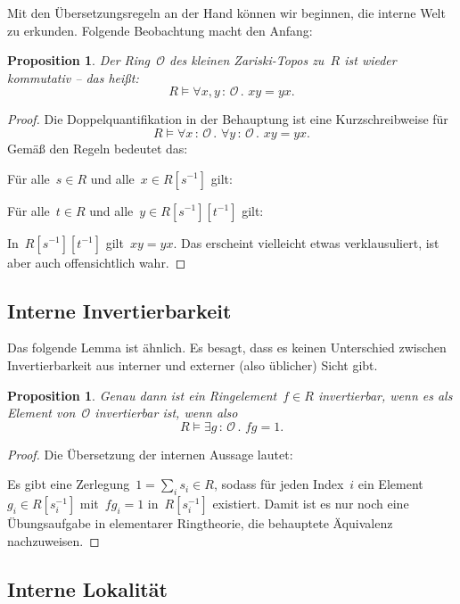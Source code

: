 \documentclass[a4paper,ngerman,12pt]{scrartcl}
\theoremstyle{definition}
\theoremstyle{plain}
\newtheorem{prop}[defn]{Proposition}
\theoremstyle{remark}
\renewcommand{\O}{\mathcal{O}}
\renewcommand{\_}{\mathpunct{.}\,}
\newcommand{\?}{\,{:}\,}
\newenvironment{indentblock}{%
  \list{}{\leftmargin\leftmargin}%
  \item\relax
}{%
  \endlist
}
\begin{document}
Mit den Übersetzungsregeln an der Hand können wir beginnen, die interne Welt zu
erkunden. Folgende Beobachtung macht den Anfang:

\begin{prop}Der Ring~$\O$ des kleinen Zariski-Topos zu~$R$ ist wieder
kommutativ -- das heißt:
\[ R \models \forall x,y \? \O\_ x y = y x. \]
\end{prop}
\begin{proof}Die Doppelquantifikation in der Behauptung ist eine
Kurzschreibweise für
\[ R \models \forall x\?\O\_ \forall y\?\O\_ x y = y x. \]
Gemäß den Regeln bedeutet das:
\begin{indentblock}
Für alle~$s \in R$ und alle~$x \in R[s^{-1}]$ gilt:
\begin{indentblock}
Für alle~$t \in R$ und alle~$y \in R[s^{-1}][t^{-1}]$ gilt:
\begin{indentblock}
In~$R[s^{-1}][t^{-1}]$ gilt~$xy = yx$.
\end{indentblock}
\end{indentblock}
\end{indentblock}
Das erscheint vielleicht etwas verklausuliert, ist aber auch offensichtlich
wahr.
\end{proof}


\subsection{Interne Invertierbarkeit}

Das folgende Lemma ist ähnlich. Es besagt, dass es keinen Unterschied zwischen
Invertierbarkeit aus interner und externer (also üblicher) Sicht gibt.
\begin{prop}\label{interne-invertierbarkeit}%
Genau dann ist ein Ringelement~$f \in R$ invertierbar, wenn es als Element
von~$\O$ invertierbar ist, wenn also
\[ R \models \exists g\?\O\_ fg = 1. \]
\end{prop}
\begin{proof}
Die Übersetzung der internen Aussage lautet:
\begin{indentblock}
Es gibt eine Zerlegung~$1 = \sum_i s_i \in R$, sodass für jeden Index~$i$ ein
Element~$g_i \in R[s_i^{-1}]$ mit~$fg_i = 1$ in~$R[s_i^{-1}]$ existiert.
\end{indentblock}
Damit ist es nur noch eine Übungsaufgabe in elementarer Ringtheorie, die
behauptete Äquivalenz nachzuweisen.
\end{proof}


\subsection{Interne Lokalität}
\end{document}
